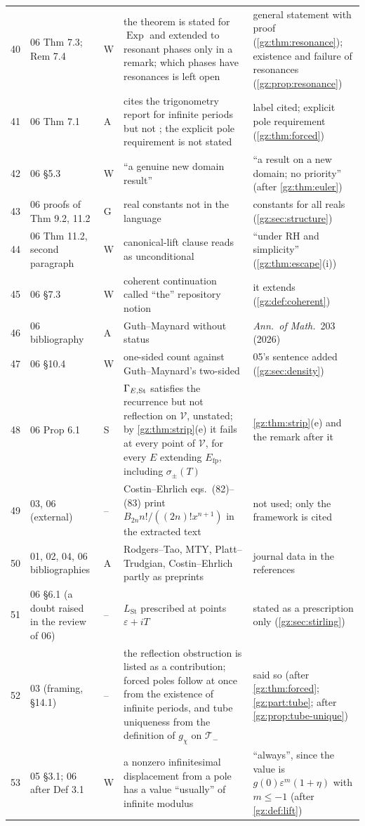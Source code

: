 \documentclass[11pt,a4paper]{article}
\numberwithin{equation}{section}
\theoremstyle{definition}
\theoremstyle{remark}
\newcommand{\eps}{\varepsilon}
\newcommand{\Exp}{\operatorname{Exp}}
\newcommand{\Efp}{E_{\mathrm{fp}}}
\newcommand{\LSt}{L_{\mathrm{St}}}
\newcommand{\Tm}{\mathcal T_{-}}
\newcommand{\Vs}{\mathcal V}
\begin{document}
\begin{center}
\begin{longtable}{@{}rP{0.16\textwidth}lP{0.30\textwidth}P{0.34\textwidth}@{}}
40 & 06 Thm 7.3; Rem 7.4 & W & the theorem is stated for $\Exp$ and extended to resonant phases only in a remark; which phases have resonances is left open & general statement with proof (\cref{gz:thm:resonance}); existence and failure of resonances (\cref{gz:prop:resonance})\\
41 & 06 Thm 7.1 & A & cites the trigonometry report for infinite periods but not ; the explicit pole requirement is not stated & label cited; explicit pole requirement (\cref{gz:thm:forced})\\
42 & 06 \S5.3 & W & ``a genuine new domain result'' & ``a result on a new domain; no priority'' (after \cref{gz:thm:euler})\\
43 & 06 proofs of Thm 9.2, 11.2 & G & real constants not in the language & constants for all reals (\cref{gz:sec:structure})\\
44 & 06 Thm 11.2, second paragraph & W & canonical-lift clause reads as unconditional & ``under RH and simplicity'' (\cref{gz:thm:escape}(i))\\
45 & 06 \S7.3 & W & coherent continuation called ``the'' repository notion & it extends  (\cref{gz:def:coherent})\\
46 & 06 bibliography & A & Guth--Maynard without status & \emph{Ann.\ of Math.}\ 203 (2026)\\
47 & 06 \S10.4 & W & one-sided count against Guth--Maynard's two-sided & 05's sentence added (\cref{gz:sec:density})\\
48 & 06 Prop 6.1 & S & $\Gamma_{E,\rm St}$ satisfies the recurrence but not reflection on $\Vs$, unstated; by \cref{gz:thm:strip}(e) it fails at every point of $\Vs$, for every $E$ extending $\Efp$, including $\sigma_\pm(T)$ & \cref{gz:thm:strip}(e) and the remark after it\\
49 & 03, 06 (external) & -- & Costin--Ehrlich eqs.\ (82)--(83) print $B_{2n}n!/((2n)!x^{n+1})$ in the extracted text & not used; only the framework is cited\\
50 & 01, 02, 04, 06 bibliographies & A & Rodgers--Tao, MTY, Platt--Trudgian, Costin--Ehrlich partly as preprints & journal data in the references\\
51 & 06 \S6.1 (a doubt raised in the review of 06) & -- & $\LSt$ prescribed at points $\eps+iT$ & stated as a prescription only (\cref{gz:sec:stirling})\\
52 & 03 (framing, \S14.1) & -- & the reflection obstruction is listed as a contribution; forced poles follow at once from the existence of infinite periods, and tube uniqueness from the definition of $g_\chi$ on $\Tm$ & said so (after \cref{gz:thm:forced}; \cref{gz:part:tube}; after \cref{gz:prop:tube-unique})\\
53 & 05 \S3.1; 06 after Def 3.1 & W & a nonzero infinitesimal displacement from a pole has a value ``usually'' of infinite modulus & ``always'', since the value is $g(0)\eps^m(1+\eta)$ with $m\le-1$ (after \cref{gz:def:lift})\\
\bottomrule
\end{longtable}
\end{center}
\end{document}
